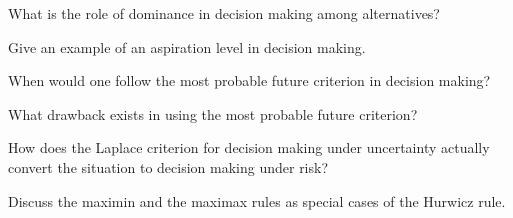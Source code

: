 \begin{exercises}
    \begin{exercise}
    \label{sea-07-29}
        What is the role of dominance in decision making among alternatives?
    \end{exercise}
    \begin{solution}
    \end{solution}
    
    \begin{exercise}
    \label{sea-07-30}
        Give an example of an aspiration level in decision making.
    \end{exercise}
    \begin{solution}
    \end{solution}
    
    \begin{exercise}
    \label{sea-07-31}
        When would one follow the most probable future criterion in decision making?
    \end{exercise}
    \begin{solution}
    \end{solution}
    
    \begin{exercise}
    \label{sea-07-32}
        What drawback exists in using the most probable future criterion?
    \end{exercise}
    \begin{solution}
    \end{solution}
    
    \begin{exercise}
    \label{sea-07-33}
        How does the Laplace criterion for decision making under uncertainty actually convert the situation to decision making under risk?
    \end{exercise}
    \begin{solution}
    \end{solution}
    
    \begin{exercise}
    \label{sea-07-34}
        Discuss the maximin and the maximax rules as special cases of the Hurwicz rule.
    \end{exercise}
    \begin{solution}
    \end{solution}
    

\end{exercises}

